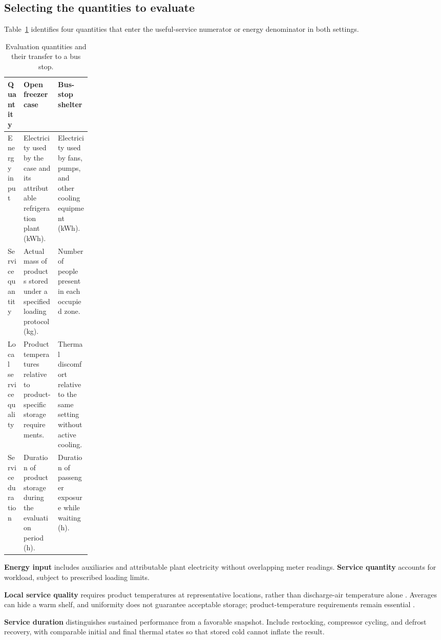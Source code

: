 \documentclass[12pt]{article}
\begin{document}
\clearpage
\subsection{Selecting the quantities to evaluate}

Table~\ref{tab:service} identifies four quantities that enter the useful-service numerator or energy denominator in both settings.

\begin{table}[!ht]
\centering
\caption{Evaluation quantities and their transfer to a bus stop.}
\label{tab:service}
\small
\renewcommand{\arraystretch}{1.18}
\begin{tabularx}{\linewidth}{@{}>{\raggedright\arraybackslash}p{0.19\linewidth}
>{\raggedright\arraybackslash}X >{\raggedright\arraybackslash}X@{}}
\toprule
Quantity & Open freezer case & Bus-stop shelter\\
\midrule
Energy input & Electricity used by the case and its attributable refrigeration plant (kWh). & Electricity used by fans, pumps, and other cooling equipment (kWh).\\
Service quantity & Actual mass of products stored under a specified loading protocol (kg). & Number of people present in each occupied zone.\\
Local service quality & Product temperatures relative to product-specific storage requirements. & Thermal discomfort relative to the same setting without active cooling.\\
Service duration & Duration of product storage during the evaluation period (h). & Duration of passenger exposure while waiting (h).\\
\bottomrule
\end{tabularx}
\end{table}

\noindent\textbf{Energy input} includes auxiliaries and attributable plant electricity without overlapping meter readings. \textbf{Service quantity} accounts for workload, subject to prescribed loading limits.

\textbf{Local service quality} requires product temperatures at representative locations, rather than discharge-air temperature alone \cite{ashrae}. Averages can hide a warm shelf, and uniformity does not guarantee acceptable storage; product-temperature requirements remain essential \cite{etl}.

\textbf{Service duration} distinguishes sustained performance from a favorable snapshot. Include restocking, compressor cycling, and defrost recovery, with comparable initial and final thermal states so that stored cold cannot inflate the result.
\end{document}
